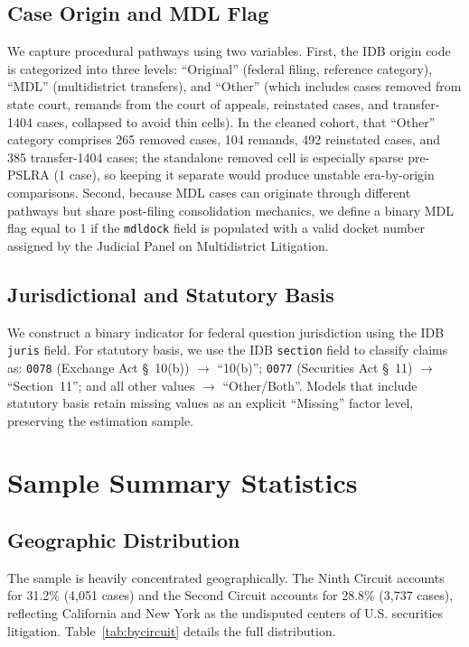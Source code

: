 \subsection{Case Origin and MDL Flag}

We capture procedural pathways using two variables. First,
the IDB origin code is categorized into three levels:
``Original'' (federal filing, reference category), ``MDL''
(multidistrict transfers), and ``Other'' (which includes
cases removed from state court, remands from the court of
appeals, reinstated cases, and transfer-1404 cases,
collapsed to avoid thin cells). In the cleaned cohort, that
``Other'' category comprises 265 removed cases, 104 remands,
492 reinstated cases, and 385 transfer-1404 cases; the
standalone removed cell is especially sparse pre-PSLRA
(1 case), so keeping it separate would produce unstable
era-by-origin comparisons.
Second, because MDL cases can originate through different
pathways but share post-filing consolidation mechanics, we
define a binary MDL flag equal to 1 if the
\texttt{mdldock} field is populated with a valid docket
number assigned by the Judicial Panel on Multidistrict
Litigation.

\subsection{Jurisdictional and Statutory Basis}

We construct a binary indicator for federal question jurisdiction 
using the IDB \texttt{juris} field. For statutory basis, we use the 
IDB \texttt{section} field to classify claims as: \texttt{0078} 
(Exchange Act \S~10(b)) $\to$ ``10(b)''; \texttt{0077} (Securities Act
\S~11) $\to$ ``Section~11''; and all other values $\to$ ``Other/Both''.
Models that include statutory basis retain missing values as an
explicit ``Missing'' factor level, preserving the estimation sample.

\section{Sample Summary Statistics}

\subsection{Geographic Distribution}
The sample is heavily concentrated geographically. The Ninth Circuit 
accounts for 31.2\% (4,051 cases) and the Second Circuit accounts for 
28.8\% (3,737 cases), reflecting California and New York as the 
undisputed centers of U.S. securities litigation. Table~\ref{tab:bycircuit} 
details the full distribution.

